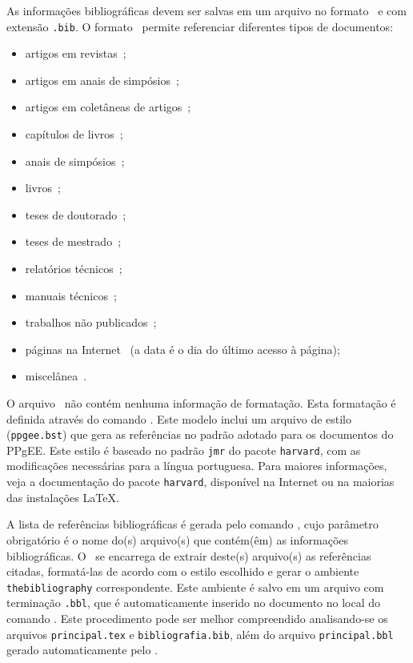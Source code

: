 As informações bibliográficas devem ser salvas em um arquivo no
formato \BibTeX\ e com extensão \texttt{.bib}. O formato \BibTeX\ 
permite referenciar diferentes tipos de documentos:
\begin{itemize}
\item artigos em revistas~\cite{art-solimaes03};
\item artigos em anais de simpósios~\cite{proc-gates01};
\item artigos em coletâneas de artigos~\cite{col-pinto00};
\item capítulos de livros~\cite{inbook-santos00};
\item anais de simpósios~\cite{proc-sbrc02};
\item livros~\cite{book-lamport94};
\item teses de doutorado~\cite{phd-gates01};
\item teses de mestrado~\cite{msc-santos03};
\item relatórios técnicos~\cite{rep-omg2000};
\item manuais técnicos~\cite{man-orbix99};
\item trabalhos não publicados~\cite{unp-sichman02};
\item páginas na Internet~\cite{hp-novet03} (a data é o dia do
      último acesso à página);
\item miscelânea~\cite{misc-cruz03}.
\end{itemize}

O arquivo \BibTeX\ não contém nenhuma informação de formatação. Esta
formatação é definida através do comando \verb||.
Este modelo inclui um arquivo de estilo (\texttt{ppgee.bst}) que gera
as referências no padrão adotado para os documentos do PPgEE. Este
estilo é baseado no padrão \texttt{jmr} do pacote \texttt{harvard}, com
as modificações necessárias para a língua portuguesa. Para maiores
informações, veja a documentação do pacote \texttt{harvard}, disponível
na Internet ou na maiorias das instalações \LaTeX.

A lista de referências bibliográficas é gerada pelo comando
\verb||, cujo parâmetro obrigatório é o nome do(s) arquivo(s)
que contém(êm) as informações bibliográficas.  O \BibTeX\ se encarrega
de extrair deste(s) arquivo(s) as referências citadas, formatá-las de acordo
com o estilo escolhido e gerar o ambiente \texttt{thebibliography}
correspondente. Este ambiente é salvo em um arquivo com terminação
\texttt{.bbl}, que é automaticamente inserido no documento no local do
comando \verb||. Este procedimento pode ser melhor
compreendido analisando-se os arquivos \texttt{principal.tex} e
\texttt{bibliografia.bib}, além do arquivo \texttt{principal.bbl}
gerado automaticamente pelo \BibTeX.


